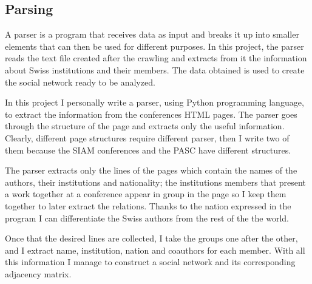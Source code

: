 \documentclass[]{usiinfbachelorproject}
\begin{document}
\subsection{Parsing}
A parser is a program that receives data as input and breaks it up into smaller elements that can then be used for different purposes. In this project, the parser reads the text file created after the crawling and extracts from it the information about Swiss institutions and their members. The data obtained is used to create the social network ready to be analyzed.

In this project I personally write a parser, using Python programming language, to extract the information from the conferences HTML pages. The parser goes through the structure of the page and extracts only the useful information. Clearly, different page structures require different parser, then I write two of them because the SIAM conferences and the PASC have different structures.

The parser extracts only the lines of the pages which contain the names of the authors, their institutions and nationality; the institutions members that present a work together at a conference appear in group in the page so I keep them together to later extract the relations. Thanks to the nation expressed in the program I can differentiate the Swiss authors from the rest of the the world. 

Once that the desired lines are collected, I take the groups one after the other, and I extract name, institution, nation and coauthors for each member. With all this information I manage to construct a social network and its corresponding adjacency matrix.
\end{document}
